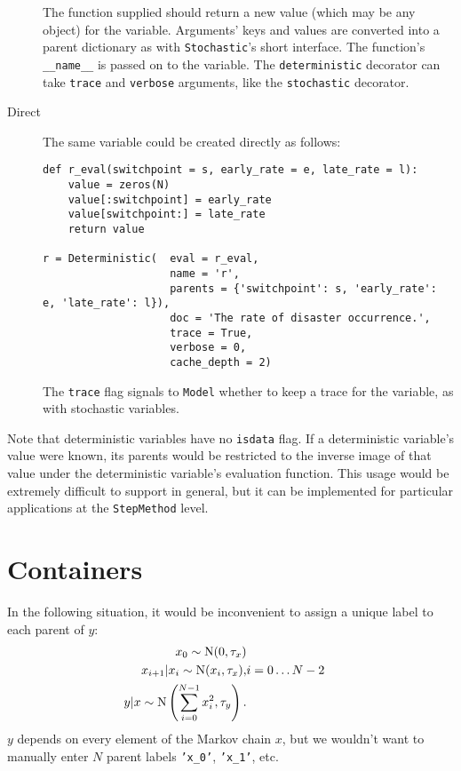 \begin{description}
The function supplied should return a new value (which may be any object) for the variable. Arguments' keys and values are converted into a parent dictionary as with \texttt{Stochastic}'s short interface. The function's \mbox{\texttt{__name__}} is passed on to the variable. The \texttt{deterministic} decorator can take \texttt{trace} and \texttt{verbose} arguments, like the \texttt{stochastic} decorator.
    \item[Direct] The same variable could be created directly as follows:
\begin{verbatim}
def r_eval(switchpoint = s, early_rate = e, late_rate = l):
    value = zeros(N)
    value[:switchpoint] = early_rate
    value[switchpoint:] = late_rate
    return value

r = Deterministic(  eval = r_eval, 
                    name = 'r',
                    parents = {'switchpoint': s, 'early_rate': e, 'late_rate': l}),
                    doc = 'The rate of disaster occurrence.',
                    trace = True,
                    verbose = 0,
                    cache_depth = 2)
\end{verbatim}
The \texttt{trace} flag signals to \texttt{Model} whether to keep a trace for the variable, as with stochastic variables.
\end{description}

Note that deterministic variables have no \texttt{isdata} flag. If a deterministic variable's value were known, its parents would be restricted to the inverse image of that value under the deterministic variable's evaluation function. This usage would be extremely difficult to support in general, but it can be implemented for particular applications at the \texttt{StepMethod} level.

\hypertarget{container}{}
\section*{Containers} \label{container}

In the following situation, it would be inconvenient to assign a unique label to each parent of $y$:
\begin{eqnarray*}
    x_0 \sim \textup N(0,\tau_x)\\
    x_{i+1}|x_i\sim\textup{N}(x_i, \tau_x),& i=0\ldots N-2\\
    y|x \sim \textup N\left(\sum_{i=0}^{N-1}x_i^2,\tau_y\right).
\end{eqnarray*}
$y$ depends on every element of the Markov chain $x$, but we wouldn't want to manually enter $N$ parent labels \texttt{'x_0'}, \texttt{'x_1'}, etc.

